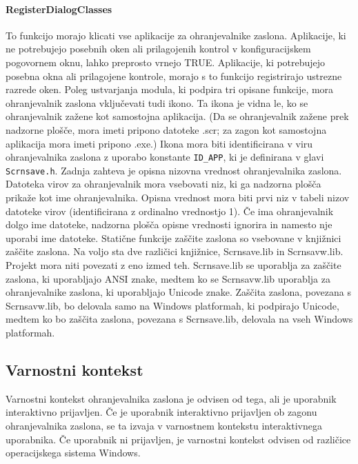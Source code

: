 \documentclass[11pt, oneside]{article}   	%
\begin{document}
\paragraph{RegisterDialogClasses}
To funkcijo morajo klicati vse aplikacije za ohranjevalnike zaslona. Aplikacije, ki ne potrebujejo posebnih oken ali prilagojenih kontrol v konfiguracijskem pogovornem oknu, lahko preprosto vrnejo TRUE. Aplikacije, ki potrebujejo posebna okna ali prilagojene kontrole, morajo s to funkcijo registrirajo ustrezne razrede oken.
\newline
Poleg ustvarjanja modula, ki podpira tri opisane funkcije, mora ohranjevalnik zaslona vključevati tudi ikono. Ta ikona je vidna le, ko se ohranjevalnik zažene kot samostojna aplikacija. (Da se ohranjevalnik zažene prek nadzorne plošče, mora imeti pripono datoteke .scr; za zagon kot samostojna aplikacija mora imeti pripono .exe.) Ikona mora biti identificirana v viru ohranjevalnika zaslona z uporabo konstante \Verb#ID_APP#, ki je definirana v glavi \Verb#Scrnsave.h#.
\newline
Zadnja zahteva je opisna nizovna vrednost ohranjevalnika zaslona. Datoteka virov za ohranjevalnik mora vsebovati niz, ki ga nadzorna plošča prikaže kot ime ohranjevalnika. Opisna vrednost mora biti prvi niz v tabeli nizov datoteke virov (identificirana z ordinalno vrednostjo 1). Če ima ohranjevalnik dolgo ime datoteke, nadzorna plošča opisne vrednosti ignorira in namesto nje uporabi ime datoteke.
\newline
Statične funkcije zaščite zaslona so vsebovane v knjižnici zaščite zaslona. Na voljo sta dve različici knjižnice, Scrnsave.lib in Scrnsavw.lib. Projekt mora niti povezati z eno izmed teh. Scrnsave.lib se uporablja za zaščite zaslona, ki uporabljajo ANSI znake, medtem ko se Scrnsavw.lib uporablja za ohranjevalnike zaslona, ki uporabljajo Unicode znake. Zaščita zaslona, povezana s Scrnsavw.lib, bo delovala samo na Windows platformah, ki podpirajo Unicode, medtem ko bo zaščita zaslona, povezana s Scrnsave.lib, delovala na vseh Windows platformah.


\subsection{Varnostni kontekst}
Varnostni kontekst ohranjevalnika zaslona je odvisen od tega, ali je uporabnik interaktivno prijavljen. Če je uporabnik interaktivno prijavljen ob zagonu ohranjevalnika zaslona, se ta izvaja v varnostnem kontekstu interaktivnega uporabnika. Če uporabnik ni prijavljen, je varnostni kontekst odvisen od različice operacijskega sistema Windows.
\end{document}
